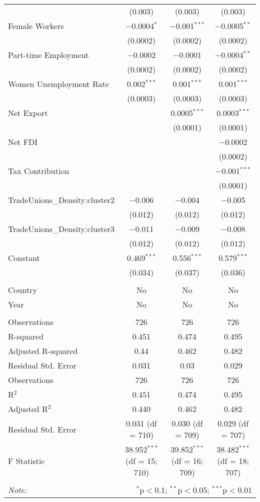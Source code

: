 \begin{table}[!htbp]
\begin{tabular}{@{\extracolsep{5pt}}lccc}
  & (0.003) & (0.003) & (0.003) \\ 
  Female Workers & $-$0.0004$^{*}$ & $-$0.001$^{***}$ & $-$0.0005$^{**}$ \\ 
  & (0.0002) & (0.0002) & (0.0002) \\ 
  Part-time Employment & $-$0.0002 & $-$0.0001 & $-$0.0004$^{**}$ \\ 
  & (0.0002) & (0.0002) & (0.0002) \\ 
  Women Unemployment Rate & 0.002$^{***}$ & 0.001$^{***}$ & 0.001$^{***}$ \\ 
  & (0.0003) & (0.0003) & (0.0003) \\ 
  Net Export &  & 0.0005$^{***}$ & 0.0003$^{***}$ \\ 
  &  & (0.0001) & (0.0001) \\ 
  Net FDI &  &  & $-$0.0002 \\ 
  &  &  & (0.0002) \\ 
  Tax Contribution &  &  & $-$0.001$^{***}$ \\ 
  &  &  & (0.0001) \\ 
  TradeUnions\_Density:cluster2 & $-$0.006 & $-$0.004 & $-$0.005 \\ 
  & (0.012) & (0.012) & (0.012) \\ 
  TradeUnions\_Density:cluster3 & $-$0.011 & $-$0.009 & $-$0.008 \\ 
  & (0.012) & (0.012) & (0.012) \\ 
  Constant & 0.469$^{***}$ & 0.556$^{***}$ & 0.579$^{***}$ \\ 
  & (0.034) & (0.037) & (0.036) \\ 
 \hline \\[-1.8ex] 
Country & No & No & No \\ 
Year & No & No & No \\ 
\hline \\[-1.8ex] 
Observations & 726 & 726 & 726 \\ 
R-squared & 0.451 & 0.474 & 0.495 \\ 
Adjusted R-squared & 0.44 & 0.462 & 0.482 \\ 
Residual Std. Error & 0.031 & 0.03 & 0.029 \\ 
Observations & 726 & 726 & 726 \\ 
R$^{2}$ & 0.451 & 0.474 & 0.495 \\ 
Adjusted R$^{2}$ & 0.440 & 0.462 & 0.482 \\ 
Residual Std. Error & 0.031 (df = 710) & 0.030 (df = 709) & 0.029 (df = 707) \\ 
F Statistic & 38.952$^{***}$ (df = 15; 710) & 39.852$^{***}$ (df = 16; 709) & 38.482$^{***}$ (df = 18; 707) \\ 
\hline 
\hline \\[-1.8ex] 
\textit{Note:}  & \multicolumn{3}{r}{$^{*}$p$<$0.1; $^{**}$p$<$0.05; $^{***}$p$<$0.01} \\ 
\end{tabular} 
\end{table} 
